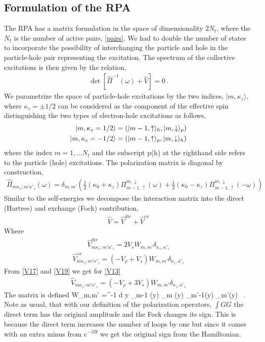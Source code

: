 \subsection{Formulation of the RPA}
The RPA has a matrix formulation in the space of dimensionality $2 N_t$, where the $N_t$ is the number of active pairs, \eqref{pairs}.
We had to double the number of states to incorporate the possibility of interchanging the particle and hole in the particle-hole pair representing the excitation.
The spectrum of the collective excitations is then given by the relation,
\begin{align}\label{RPA13}
\det \left[ \hat{\Pi}^{-1}(\omega) + \hat{V} \right] = 0\, . 
\end{align}
We parametrize the space of particle-hole excitations by the two indices,
$|m,\kappa_z \rangle$, where $\kappa_z= \pm 1/2$ can be considered as the  component of the effective spin distinguishing the two types of electron-hole excitations as follows,
\begin{align}\label{RPA15}
|m,\kappa_z =1/2 \rangle &= ( |m-1,\uparrow\rangle_h, |m,\downarrow \rangle_p) \notag \\
|m,\kappa_z =-1/2 \rangle &= ( |m-1,\uparrow\rangle_p, |m,\downarrow \rangle_h)
\end{align}
where the index $m=1, \ldots N_t$ and the subscript p(h) at the righthand side refers to the particle (hole) excitations.
The polarization matrix is diagonal by construction,
\begin{align}\label{RPA17}
\hat{\Pi}_{m\kappa_z;m'\kappa'_z}(\omega) = \delta_{m,m'} \left(
\frac{1}{2}( \kappa_0 + \kappa_z) \Pi^{m,\downarrow}_{m-1,\uparrow}(\omega)
+
\frac{1}{2}( \kappa_0 - \kappa_z) \Pi^{m,\downarrow}_{m-1,\uparrow}(-\omega)
\right)
\end{align}
Similar to the self-energies we decompose the interaction matrix into the direct (Hartree) and exchange (Fock) contribution,
\begin{align}\label{V13}
\hat{V} =\hat{V}^{dir} + \hat{V}^{ex}
\end{align}
Where 
\begin{align}\label{V17}
\hat{V}^{dir}_{m\kappa_z;m'\kappa'_z} = 2 V_s W_{m,m'} \delta_{\kappa_z,\kappa'_z}
\end{align}
%
\begin{align}\label{V19}
\hat{V}^{ex}_{m\kappa_z;m'\kappa'_z} = (-V_{\rho} + V_s) W_{m,m'} \delta_{\kappa_z,\kappa'_z}
\end{align}
From \eqref{V17} and \eqref{V19} we get for \eqref{V13}
%
\begin{align}\label{V21}
\hat{V}_{m\kappa_z;m'\kappa'_z} = (-V_{\rho} + 3 V_s) W_{m,m'} \delta_{\kappa_z,\kappa'_z}
\end{align}
The matrix is defined 
\be\label{V23}
W_{m,m'} =\ell^{-1} \int d y \psi_{m-1} (y)  \psi_{m} (y) \psi_{m'-1}(y) \psi_{m'}(y) \, .
\ee
Note as usual, that with our definition of the polarization operators, $\int GG$ the direct term has the original amplitude and the Fock changes its sign. 
This is because the direct term increases the  number of loops by one but since it comes with an extra minus from $e^{ - \beta H}$ we get the original sign from the Hamiltonian.

